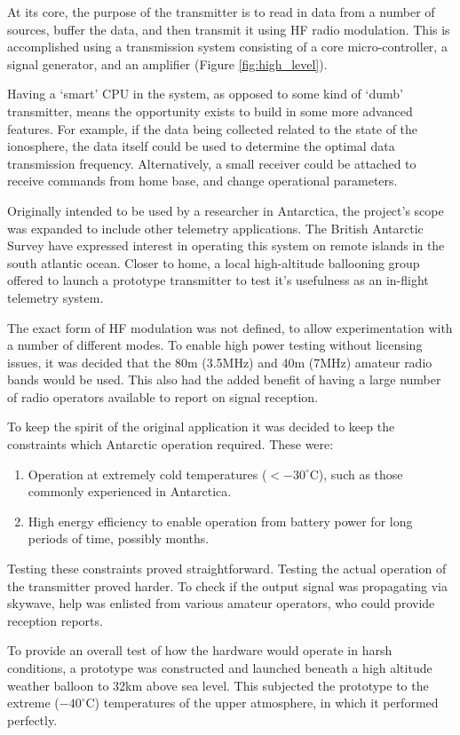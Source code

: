 \documentclass[a4paper,12pt]{article}
\begin{document}
At its core, the purpose of the transmitter is to read in data from a number of sources, buffer the data, and then transmit it using HF radio modulation. This is accomplished using a transmission system consisting of a core micro-controller, a signal generator, and an amplifier (Figure \ref{fig:high_level}).

Having a `smart' CPU in the system, as opposed to some kind of `dumb' transmitter, means the opportunity exists to build in some more advanced features. For example, if the data being collected related to the state of the ionosphere, the data itself could be used to determine the optimal data transmission frequency. Alternatively, a small receiver could be attached to receive commands from home base, and change operational parameters.

Originally intended to be used by a researcher in Antarctica, the project's scope was expanded to include other telemetry applications. The British Antarctic Survey have expressed interest in operating this system on remote islands in the south atlantic ocean. Closer to home, a local high-altitude ballooning group offered to launch a prototype transmitter to test it's usefulness as an in-flight telemetry system.


The exact form of HF modulation was not defined, to allow experimentation with a number of different modes. To enable high power testing without licensing issues, it was decided that the 80m (3.5MHz) and 40m (7MHz) amateur radio bands would be used. This also had the added benefit of having a large number of radio operators available to report on signal reception.

To keep the spirit of the original application it was decided to keep the constraints which Antarctic operation required. These were:
\begin{enumerate}
\item Operation at extremely cold temperatures ($<-30^\circ$C), such as those commonly experienced in Antarctica.
\item High energy efficiency to enable operation from battery power for long periods of time, possibly months.
\end{enumerate}

Testing these constraints proved straightforward. Testing the actual operation of the transmitter proved harder. To check if the output signal was propagating via skywave, help was enlisted from various amateur operators, who could provide reception reports. 

To provide an overall test of how the hardware would operate in harsh conditions, a prototype was constructed and launched beneath a high altitude weather balloon to 32km above sea level. This subjected the prototype to the extreme ($-40^\circ$C) temperatures of the upper atmosphere, in which it performed perfectly.
\end{document}
